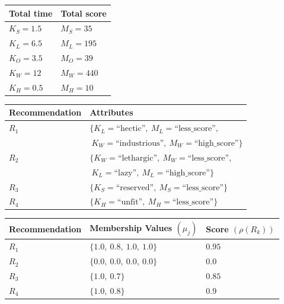 \documentclass[conference]{IEEEtran}
\newcommand{\quotes}[1]{``#1''}
\begin{document}
\begin{table}
\small
{}
\begin{center}
\def\arraystretch{1.7}
\begin{tabular}{| l | l |}
\hline
\bf Total time & \bf Total score \\
\hline
$K_S=1.5$ & $M_S=35$ \\
\hline
$K_L=6.5$ & $M_L=195$ \\
\hline
$K_O=3.5$ & $M_O=39$ \\
\hline
$K_W=12$ & $M_W=440$ \\
\hline
$K_H=0.5$ & $M_H=10$ \\
\hline
\end{tabular}
\end{center}
\end{table}
\begin{table}
\small
{}
\begin{center}
\def\arraystretch{1.7}
\begin{tabular}{| l | l |}
\hline
\bf Recommendation & \bf Attributes \\
\hline
$R_1$ & $\{K_L = \text{\quotes{hectic}},\ M_L = \text{\quotes{less\_score}},$\\&$\ K_W=\text{\quotes{industrious}},\ M_W=\text{\quotes{high\_score}}\}$ \\
\hline
$R_2$ & $\{K_W = \text{\quotes{lethargic}},\ M_W = \text{\quotes{less\_score}},$\\& $\ K_L=\text{\quotes{lazy}},\ M_L=\text{\quotes{high\_score}}\}$ \\
\hline
$R_3$ & $\{K_S = \text{\quotes{reserved}},\ M_S = \text{\quotes{less\_score}}\}$ \\
\hline
$R_4$ & $\{K_H = \text{\quotes{unfit}},\ M_H = \text{\quotes{less\_score}}\}$ \\
\hline
\end{tabular}
\end{center}
\end{table}
\begin{table}
\small
{}
\begin{center}
\def\arraystretch{1.7}
\begin{tabular}{| l | l | l |}
\hline
\bf Recommendation & \bf Membership Values $(\mu_{j})$ & \bf Score $(\rho(R_k))$ \\
\hline
$R_1$ & $\{1.0,\ 0.8,\ 1.0,\ 1.0\}$ & $0.95$ \\
\hline
$R_2$ & $\{0.0,\ 0.0,\ 0.0,\ 0.0\}$ & $0.0$ \\
\hline
$R_3$ & $\{1.0,\ 0.7\}$ & $0.85$ \\
\hline
$R_4$ & $\{1.0,\ 0.8\}$ & $0.9$ \\
\hline
\end{tabular}
\end{center}
\end{table}
\end{document}
